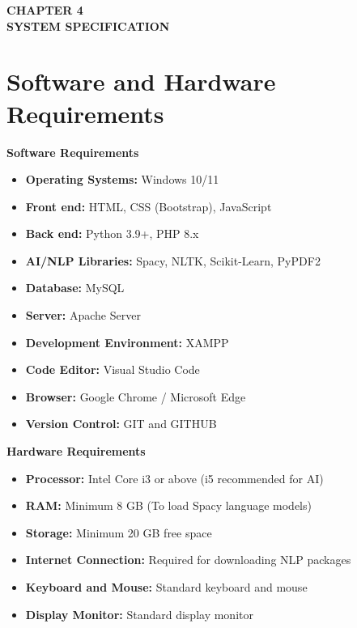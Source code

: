 \documentclass[12pt,a4paper]{report}
\begin{document}
\begin{center}
    {\fontsize{14pt}{17pt}\selectfont\textbf{CHAPTER 4}}\\[1cm]
    {\fontsize{14pt}{17pt}\selectfont\textbf{SYSTEM SPECIFICATION}}
\end{center}

\vspace*{\fill}

\clearpage


\section{Software and Hardware Requirements}


\textbf{Software Requirements}


\begin{itemize}
    \item \textbf{Operating Systems:} Windows 10/11
    \item \textbf{Front end:} HTML, CSS (Bootstrap), JavaScript
    \item \textbf{Back end:} Python 3.9+, PHP 8.x
    \item \textbf{AI/NLP Libraries:} Spacy, NLTK, Scikit-Learn, PyPDF2
    \item \textbf{Database:} MySQL
    \item \textbf{Server:} Apache Server
    \item \textbf{Development Environment:} XAMPP
    \item \textbf{Code Editor:} Visual Studio Code
    \item \textbf{Browser:} Google Chrome / Microsoft Edge
    \item \textbf{Version Control:} GIT and GITHUB
\end{itemize}

\textbf{Hardware Requirements}

\begin{itemize}
    \item \textbf{Processor:} Intel Core i3 or above (i5 recommended for AI)
    \item \textbf{RAM:} Minimum 8 GB (To load Spacy language models)
    \item \textbf{Storage:} Minimum 20 GB free space
    \item \textbf{Internet Connection:} Required for downloading NLP packages
    \item \textbf{Keyboard and Mouse:} Standard keyboard and mouse
    \item \textbf{Display Monitor:} Standard display monitor
\end{itemize}
\end{document}
